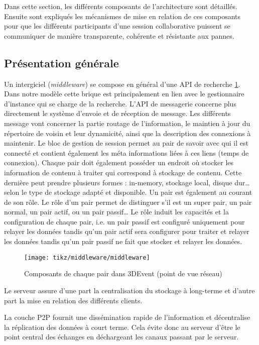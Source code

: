 Dans cette section, les différents composants de l'architecture sont détaillés. 
Ensuite sont expliqués les mécanismes de mise en relation de 
ces composants pour que les différents participants d'une session 
collaborative puissent se communiquer de manière transparente, cohérente et 
résistante aux pannes.


\subsection{Présentation générale}
Un intergiciel (\textit{middleware}) se compose en général d'une API de 
recherche \ref{fig:middleware}.
Dans notre modèle cette brique est principalement en lien avec le 
gestionnaire d'instance qui se charge de la recherche. L'API de messagerie 
concerne plus directement le système d'envoie et de réception de message. Les 
différents message vont concerner la partie routage de l'information, le 
maintien à jour du répertoire de voisin et leur dynamicité, ainsi que la 
description des connexions à maintenir. Le bloc de gestion de session permet au 
pair de savoir avec qui il est connecté et contient également les méta informations 
liées à ces liens (temps de connexion). 
Chaque pair doit également posséder un endroit où stocker les information de 
contenu à traiter qui correspond à stockage de contenu. Cette dernière peut 
prendre plusieurs formes : in-memory, stockage local, disque dur\dots selon le 
type de stockage adapté et disponible.
Un pair est également au courant de son rôle. Le rôle d'un pair permet de 
distinguer s'il est un super pair, un pair normal, un pair actif, ou un pair passif\dots 
Le rôle induit les capacités et la configuration de chaque pair, i.e. un pair passif 
est configuré uniquement pour relayer les données tandis qu'un pair actif sera 
configurer pour traiter et relayer les données tandis qu'un pair passif ne fait que 
stocker et relayer les données.
\begin{figure}[ht]
	\centering
	\texttt{[image: tikz/middleware/middleware]}
	\caption{Composants de chaque pair dans 3DEvent (point de vue réseau)}
	\label{fig:middleware}
\end{figure}

Le serveur assure d'une part la centralisation du stockage à long-terme et d'autre 
part la mise en relation des différents clients.

La couche \gls{P2P} fournit une dissémination rapide de l'information et 
décentralise la réplication des données à court terme. Cela évite donc au serveur 
d'être le point central des échanges en déchargeant les canaux passant par le 
serveur.

